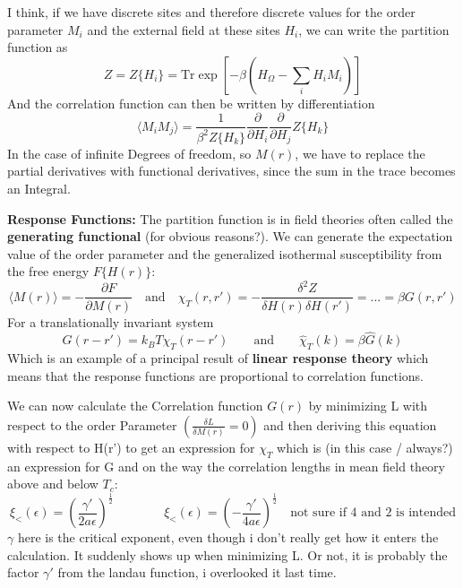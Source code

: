 	I think, if we have discrete sites and therefore discrete values for the order parameter $M_i$ and the external field at these sites $H_i$, we can write the partition function as
	\begin{equation}
		Z =	Z\lbrace H_i \rbrace  =	\text{Tr} \exp\left[- \beta \left(H_\Omega - \sum_{i}H_i M_i\right)\right]
	\end{equation}
	And the correlation function can then be written by differentiation
	\begin{equation}
		\langle M_i M_j \rangle = \frac{1}{\beta^2 Z\lbrace H_k \rbrace} \frac{\partial}{\partial H_i} \frac{\partial}{\partial H_j} Z\lbrace H_k \rbrace
	\end{equation}
	In the case of infinite Degrees of freedom, so $M(r)$, we have to replace the partial derivatives with functional derivatives, since the sum in the trace becomes an Integral.
	
	\textbf{Response Functions:} The partition function is in field theories often called the \textbf{generating functional} (for obvious reasons?). We can generate the expectation value of the order parameter and the generalized isothermal susceptibility from the free energy $F\lbrace H(r) \rbrace$:
	\begin{equation}
		\langle M(r) \rangle = - \frac{\partial F}{\partial M(r)} \quad \text{and} \quad \chi_T(r, r') =	- \frac{\delta^2 Z}{\delta H(r) \delta H(r')} = ... =	\beta G(r, r')
	\end{equation}
	For a translationally invariant system
	\begin{equation}
		G(r - r') =	k_B T \chi_T(r - r') \qquad \text{and} \qquad \hat{\chi}_T(k) =	\beta \hat{G}(k)
	\end{equation}
	Which is an example of a principal result of \textbf{linear response theory} which means that the response functions are proportional to correlation functions.
	
	We can now calculate the Correlation function $G(r)$ by minimizing L with respect to the order Parameter $\left(\frac{\delta L}{\delta M(r)} =	0\right)$ and then deriving this equation with respect to H(r') to get an expression for $\chi_T$ which is (in this case /	always?) an expression for G and on the way the correlation lengths in mean field theory above and below $T_c$:
	\begin{equation}
		\xi_<(\epsilon) =	\left(\frac{\gamma'}{2a\epsilon}\right)^{\frac{1}{2}} \qquad \qquad \xi_<(\epsilon) =	\left(- \frac{\gamma'}{4a\epsilon}\right)^{\frac{1}{2}} \quad \text{not sure if 4 and 2 is intended}
	\end{equation}
	$\gamma$ here is the critical exponent, even though i don't really get how it enters the calculation. It suddenly shows up when minimizing L. Or not, it is probably the factor $\gamma'$ from the landau function, i overlooked it last time.
	
